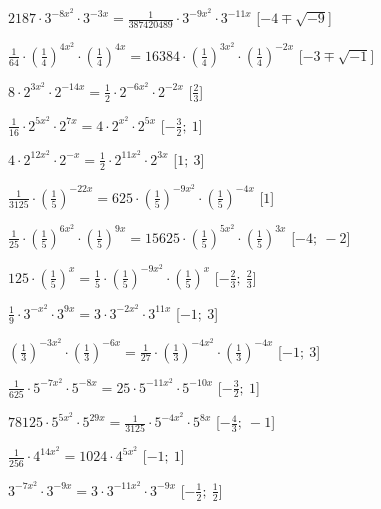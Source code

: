\begin{esercizio}
\begin{enumeratea}
  \item  \(2187 \cdot 3^{{-8x^2}} \cdot 3^{{-3x}} = \frac{1}{387420489} \cdot 
3^{{-9x^2}} \cdot 3^{{-11x}}\)
   \hfill [\(-4 \mp \sqrt{-9}\)]
  \item  \(\frac{1}{64} \cdot \left(\frac{1}{4}\right)^{{4x^2}} \cdot 
\left(\frac{1}{4}\right)^{{4x}} = 16384 \cdot \left(\frac{1}{4}\right)^{{3x^2}} 
\cdot \left(\frac{1}{4}\right)^{{-2x}}\)
   \hfill [\(-3 \mp \sqrt{-1}\)]
  \item  \(8 \cdot 2^{{3x^2}} \cdot 2^{{-14x}} = \frac{1}{2} \cdot 2^{{-6x^2}} 
\cdot 2^{{-2x}}\)
   \hfill [\(\frac{2}{3}\)]
  \item  \(\frac{1}{16} \cdot 2^{{5x^2}} \cdot 2^{{7x}} = 4 \cdot 2^{{x^2}} 
\cdot 2^{{5x}}\)
   \hfill [\(-\frac{3}{2};~1\)]
  \item  \(4 \cdot 2^{{12x^2}} \cdot 2^{{-x}} = \frac{1}{2} \cdot 2^{{11x^2}} 
\cdot 2^{{3x}}\)
   \hfill [\(1;~3\)]
  \item  \(\frac{1}{3125} \cdot \left(\frac{1}{5}\right)^{{-22x}} = 625 \cdot 
\left(\frac{1}{5}\right)^{{-9x^2}} \cdot \left(\frac{1}{5}\right)^{{-4x}}\)
   \hfill [\(1\)]
  \item  \(\frac{1}{25} \cdot \left(\frac{1}{5}\right)^{{6x^2}} \cdot 
\left(\frac{1}{5}\right)^{{9x}} = 15625 \cdot \left(\frac{1}{5}\right)^{{5x^2}} 
\cdot \left(\frac{1}{5}\right)^{{3x}}\)
   \hfill [\(-4;~-2\)]
  \item  \(125 \cdot \left(\frac{1}{5}\right)^{{x}} = \frac{1}{5} \cdot 
\left(\frac{1}{5}\right)^{{-9x^2}} \cdot \left(\frac{1}{5}\right)^{{x}}\)
   \hfill [\(-\frac{2}{3};~\frac{2}{3}\)]
  \item  \(\frac{1}{9} \cdot 3^{{-x^2}} \cdot 3^{{9x}} = 3 \cdot 3^{{-2x^2}} 
\cdot 3^{{11x}}\)
   \hfill [\(-1;~3\)]
  \item  \(\left(\frac{1}{3}\right)^{{-3x^2}} \cdot 
\left(\frac{1}{3}\right)^{{-6x}} = \frac{1}{27} \cdot 
\left(\frac{1}{3}\right)^{{-4x^2}} \cdot \left(\frac{1}{3}\right)^{{-4x}}\)
   \hfill [\(-1;~3\)]
  \item  \(\frac{1}{625} \cdot 5^{{-7x^2}} \cdot 5^{{-8x}} = 25 \cdot 
5^{{-11x^2}} \cdot 5^{{-10x}}\)
   \hfill [\(-\frac{3}{2};~1\)]
  \item  \(78125 \cdot 5^{{5x^2}} \cdot 5^{{29x}} = \frac{1}{3125} \cdot 
5^{{-4x^2}} \cdot 5^{{8x}}\)
   \hfill [\(-\frac{4}{3};~-1\)]
  \item  \(\frac{1}{256} \cdot 4^{{14x^2}} = 1024 \cdot 4^{{5x^2}}\)
   \hfill [\(-1;~1\)]
  \item  \(3^{{-7x^2}} \cdot 3^{{-9x}} = 3 \cdot 3^{{-11x^2}} \cdot 3^{{-9x}}\)
   \hfill [\(-\frac{1}{2};~\frac{1}{2}\)]
 \end{enumeratea}
\end{esercizio}


